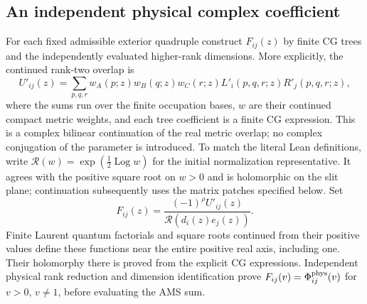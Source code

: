 \documentclass[10pt,a4paper]{article}
\newenvironment{revision}{\begingroup}{\endgroup}
\begin{document}
\begin{revision}
\subsection{An independent physical complex coefficient}
For each fixed admissible exterior quadruple construct $F_{ij}(z)$ by
finite CG trees and the independently evaluated higher-rank dimensions.
More explicitly, the continued rank-two overlap is
\begin{equation}\label{eq:certcomplexCG}
 U'_{ij}(z)=\sum_{p,q,r}
   w_A(p;z)w_B(q;z)w_C(r;z)
   L'_i(p,q,r;z)R'_j(p,q,r;z),
\end{equation}
where the sums run over the finite occupation bases, $w$ are their
continued compact metric weights, and each tree coefficient is a finite
CG expression. This is a complex bilinear continuation of the real
metric overlap; no complex conjugation of the parameter is introduced.
To match the literal Lean definitions, write
$\mathcal R(w)=\exp(\tfrac12\operatorname{Log}w)$ for the initial
normalization representative. It agrees with the positive square root
on $w>0$ and is holomorphic on the slit plane; continuation subsequently
uses the matrix patches specified below. Set
\[
 F_{ij}(z)=\frac{(-1)^\rho U'_{ij}(z)}{\mathcal R(d_i(z)e_j(z))}.
\]
Finite Laurent quantum factorials and square roots continued from their
positive values define these functions near the entire positive real
axis, including one. Their holomorphy there is proved from the explicit
CG expressions. Independent physical rank reduction and dimension
identification prove $F_{ij}(v)=\Phi^{\rm phys}_{ij}(v)$ for $v>0$,
$v\ne1$, before evaluating the AMS sum.


\end{revision}
\end{document}
